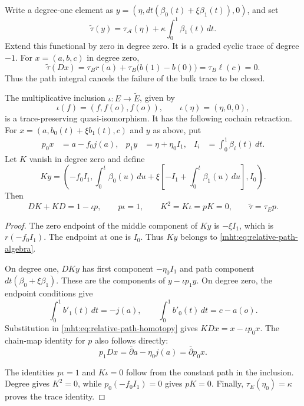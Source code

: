 Write a degree-one element as
$y=(\eta,dt(\beta_0(t)+\xi\beta_1(t)),0)$, and set
\begin{equation}\label{mht:eq:relative-path-trace}
 \widetilde\tau(y)=\tau_{\mathcal A}(\eta)
                            +\kappa\int_0^1\beta_1(t)\,dt.
\end{equation}
Extend this functional by zero in degree zero. It is a graded cyclic
trace of degree $-1$. For $x=(a,b,c)$ in degree zero,
\[
 \widetilde\tau(Dx)
 =\tau_Br(a)+\tau_B\bigl(b(1)-b(0)\bigr)
 =\tau_B\ell(c)=0.
\]
Thus the path integral cancels the failure of the bulk trace to be
closed.

\begin{proposition}\label{mht:prop:relative-path-retraction}
The multiplicative inclusion $\iota:E\to\widetilde E$, given by
\[
 \iota(f)=(f,f(o),f(o)),\qquad \iota(\eta)=(\eta,0,0),
\]
is a trace-preserving quasi-isomorphism. It has the following cochain
retraction. For
$x=(a,b_0(t)+\xi b_1(t),c)$ and $y$ as above, put
\begin{align}
 p_0x&=a-f_0j(a),&
 p_1y&=\eta+\eta_0I_1,&
 I_i&=\int_0^1\beta_i(t)\,dt.\label{mht:eq:relative-path-projection}
\end{align}
Let $K$ vanish in degree zero and define
\begin{equation}\label{mht:eq:relative-path-homotopy}
 Ky=\left(-f_0I_1,
  \int_0^t\beta_0(u)\,du
    +\xi\left[-I_1+\int_0^t\beta_1(u)\,du\right],I_0\right).
\end{equation}
Then
\[
 DK+KD=1-\iota p,\qquad p\iota=1,\qquad
 K^2=K\iota=pK=0,\qquad \widetilde\tau=\tau_Ep.
\]
\end{proposition}

\begin{proof}
The zero endpoint of the middle component of $Ky$ is $-\xi I_1$,
which is $r(-f_0I_1)$. The endpoint at one is $I_0$. Thus $Ky$ belongs
to \eqref{mht:eq:relative-path-algebra}.

On degree one, $DKy$ has first component $-\eta_0I_1$ and path
component $dt(\beta_0+\xi\beta_1)$. These are the components of
$y-\iota p_1y$. On degree zero, the endpoint conditions give
\[
 \int_0^1b'_1(t)\,dt=-j(a),\qquad
 \int_0^1b'_0(t)\,dt=c-a(o).
\]
Substitution in \eqref{mht:eq:relative-path-homotopy} gives
$KDx=x-\iota p_0x$. The chain-map identity for $p$ also follows
directly:
\[
 p_1Dx=\bar\partial a-\eta_0j(a)=\bar\partial p_0x.
\]

The identities $p\iota=1$ and $K\iota=0$ follow from the constant
path in the inclusion. Degree gives $K^2=0$, while
$p_0(-f_0I_1)=0$ gives $pK=0$.
Finally, $\tau_E(\eta_0)=\kappa$ proves the trace identity.
\end{proof}

